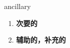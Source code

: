 
\begin{frame}
{\huge ancillary}
\begin{center}
\begin{enumerate}\Large
  \item \textbf{次要的}
  \item \textbf{辅助的，补充的}
\end{enumerate}
\end{center}
\end{frame}
